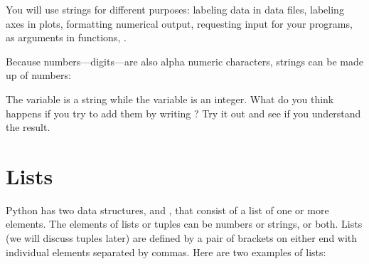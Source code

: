 \documentclass[letterpaper,10pt,english]{sphinxmanual}
\begin{document}
\sphinxAtStartPar
You will use strings for different purposes: labeling data in data files, labeling axes in plots, formatting numerical output, requesting input for your programs, as arguments in functions, .

\sphinxAtStartPar
Because numbers—digits—are also alpha numeric characters, strings can be made up of numbers:

\begin{sphinxVerbatim}[commandchars=\\\{\}]
  
  
\end{sphinxVerbatim}

\sphinxAtStartPar
The variable  is a string while the variable  is an integer.  What do you think happens if you try to add them by writing ?  Try it out and see if you understand the result.

\ignorespaces 

\section{Lists}
\label{\detokenize{chap3/chap3_arrays:lists}}\label{\detokenize{chap3/chap3_arrays:index-5}}
\sphinxAtStartPar
Python has two data structures,  and , that consist of a list of one or more elements.  The elements of lists or tuples can be numbers or strings, or both.  Lists (we will discuss tuples later) are defined by a pair of  brackets on either end with individual elements separated by commas.  Here are two examples of lists:

\begin{sphinxVerbatim}[commandchars=\\\{\}]
  \PYG{p}{[}       \PYG{p}{]}
  \PYG{p}{[}    \PYG{p}{]}
\end{sphinxVerbatim}
\end{document}
